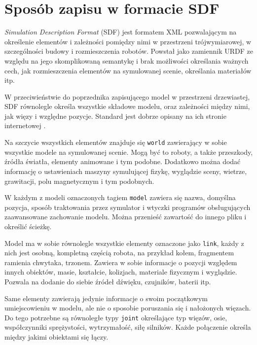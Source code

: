 \section{Sposób zapisu w formacie SDF}
\emph{Simulation Description Format} (SDF) jest formatem XML pozwalającym na określenie elementów i zależności pomiędzy nimi w przestrzeni trójwymiarowej, w szczególności budowy i rozmieszczenia robotów.
Powstał jako zamiennik URDF ze względu na jego skomplikowaną semantykę i brak możliwości określania ważnych cech, jak rozmieszczenia elementów na symulowanej scenie, określania materiałów itp.

W przeciwieństwie do poprzednika zapisującego model w przestrzeni drzewiastej, SDF równolegle określa wszystkie składowe modelu, oraz zależności między nimi, jak więzy i względne pozycje.
Standard jest dobrze opisany na ich stronie internetowej \cite{sdf_website}.

Na szczycie wszystkich elementów znajduje się \texttt{world} zawierający w sobie wszystkie modele na symulowanej scenie.
Mogą być to roboty, a także przeszkody, źródła światła, elementy animowane i tym podobne.
Dodatkowo można dodać informację o ustawieniach maszyny symulującej fizykę, wyglądzie sceny, wietrze, grawitacji, polu magnetycznym i tym podobnych.

W każdym z modeli oznaczonych tagiem \texttt{model} zawiera się nazwa, domyślna pozycja, sposób traktowania przez symulator i wtyczki programów obsługujących zaawansowane zachowanie modelu.
Można przenieść zawartość do innego pliku i określić ścieżkę.

Model ma w sobie równolegle wszystkie elementy oznaczone jako \texttt{link}, każdy z nich jest osobną, kompletną częścią robota, na przykład kołem, fragmentem ramienia chwytaka, trzonem.
Zawiera w sobie informacje o pozycji względem innych obiektów, masie, kształcie, kolizjach, materiale fizycznym i wyglądzie.
Pozwala na dodanie do siebie źródeł dźwięku, czujników, baterii itp.

Same elementy zawierają jedynie informacje o swoim początkowym umiejscowieniu w modelu, ale nie o sposobie poruszania się i nałożonych więzach.
Do tego potrzebne są równoległe typy \texttt{joint} określające typ więzów, osie, współczynniki sprężystości, wytrzymałość, siłę silników.
Każde połączenie określa między jakimi obiektami się łączy.

